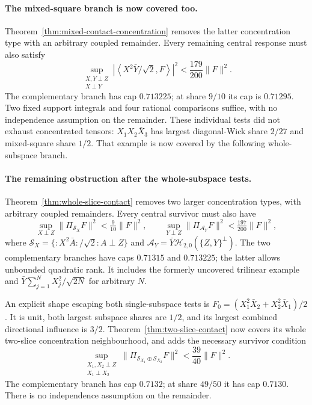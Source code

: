 \paragraph{The mixed-square branch is now covered too.}
Theorem~\ref{thm:mixed-contact-concentration} removes the latter
concentration type with an arbitrary coupled remainder. Every remaining
central response must also satisfy
\[
 \sup_{\substack{X,Y\perp Z\\X\perp Y}}
 \left|\left\langle X^2\bar Y/\sqrt2,F\right\rangle\right|^2
       <\frac{179}{200}\|F\|^2.
\]
The complementary branch has cap $0.713225$; at share $9/10$ its cap is
$0.71295$. Two fixed support integrals and four rational comparisons
suffice, with no independence assumption on the remainder.
These individual tests did not exhaust concentrated tensors:
$X_1X_2\bar X_3$ has largest diagonal-Wick share $2/27$ and
mixed-square share $1/2$. That example is now covered by the following
whole-subspace branch.

\paragraph{The remaining obstruction after the whole-subspace tests.}
Theorem~\ref{thm:whole-slice-contact} removes two larger concentration
types, with arbitrary coupled remainders. Every central survivor must
also have
\[
 \sup_{X\perp Z}\|\Pi_{\mathcal S_X}F\|^2<\tfrac9{10}\|F\|^2,
 \qquad
 \sup_{Y\perp Z}\|\Pi_{\mathcal A_Y}F\|^2<\tfrac{197}{200}\|F\|^2,
\]
where $\mathcal S_X=\{{:}X^2\bar A{:}/\sqrt2:A\perp Z\}$ and
$\mathcal A_Y=\bar Y\mathcal H_{2,0}(\{Z,Y\}^\perp)$.
The two complementary branches have caps $0.71315$ and $0.713225$;
the latter allows unbounded quadratic rank. It includes the formerly
uncovered trilinear example and
$\bar Y\sum_{j=1}^NX_j^2/\sqrt{2N}$ for arbitrary $N$.

An explicit shape escaping both single-subspace tests is
$F_0=(X_1^2\bar X_2+X_2^2\bar X_1)/2$. It is unit, both largest
subspace shares are $1/2$, and its largest combined directional
influence is $3/2$. Theorem~\ref{thm:two-slice-contact} now covers its
whole two-slice concentration neighbourhood, and adds the necessary
survivor condition
\[
 \sup_{\substack{X_1,X_2\perp Z\\X_1\perp X_2}}
 \|\Pi_{\mathcal S_{X_1}\oplus\mathcal S_{X_2}}F\|^2
       <\frac{39}{40}\|F\|^2.
\]
The complementary branch has cap $0.7132$; at share $49/50$ it has
cap $0.7130$. There is no independence assumption on the remainder.

